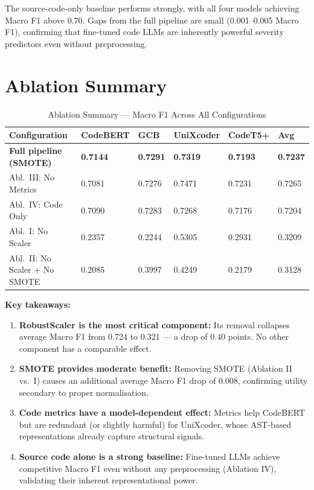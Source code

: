 \documentclass[12pt, a4paper]{report}
\begin{document}
The source-code-only baseline performs strongly, with all four models achieving Macro F1 above 0.70. Gaps from the full pipeline are small (0.001--0.005 Macro F1), confirming that fine-tuned code LLMs are inherently powerful severity predictors even without preprocessing.

\section{Ablation Summary}

\begin{table}[H]
\centering
\caption{Ablation Summary --- Macro F1 Across All Configurations}
\label{tab:abl_summary}
\begin{tabular}{L{4cm} C{2cm} C{2cm} C{2cm} C{2cm} C{1.8cm}}
\toprule
\textbf{Configuration} & \textbf{CodeBERT} & \textbf{GCB} & \textbf{UniXcoder} & \textbf{CodeT5+} & \textbf{Avg} \\
\midrule
\textbf{Full pipeline (SMOTE)} & \textbf{0.7144} & \textbf{0.7291} & \textbf{0.7319} & \textbf{0.7193} & \textbf{0.7237} \\
Abl.\ III: No Metrics          & 0.7081 & 0.7276 & 0.7471 & 0.7231 & 0.7265 \\
Abl.\ IV: Code Only            & 0.7090 & 0.7283 & 0.7268 & 0.7176 & 0.7204 \\
Abl.\ I: No Scaler             & 0.2357 & 0.2244 & 0.5305 & 0.2931 & 0.3209 \\
Abl.\ II: No Scaler + No SMOTE & 0.2085 & 0.3997 & 0.4249 & 0.2179 & 0.3128 \\
\bottomrule
\end{tabular}
\end{table}

\noindent\textbf{Key takeaways:}
\begin{enumerate}
  \item \textbf{RobustScaler is the most critical component:} Its removal collapses average Macro F1 from 0.724 to 0.321 --- a drop of 0.40 points. No other component has a comparable effect.
  \item \textbf{SMOTE provides moderate benefit:} Removing SMOTE (Ablation II vs.\ I) causes an additional average Macro F1 drop of 0.008, confirming utility secondary to proper normalisation.
  \item \textbf{Code metrics have a model-dependent effect:} Metrics help CodeBERT but are redundant (or slightly harmful) for UniXcoder, whose AST-based representations already capture structural signals.
  \item \textbf{Source code alone is a strong baseline:} Fine-tuned LLMs achieve competitive Macro F1 even without any preprocessing (Ablation IV), validating their inherent representational power.
\end{enumerate}
\end{document}
